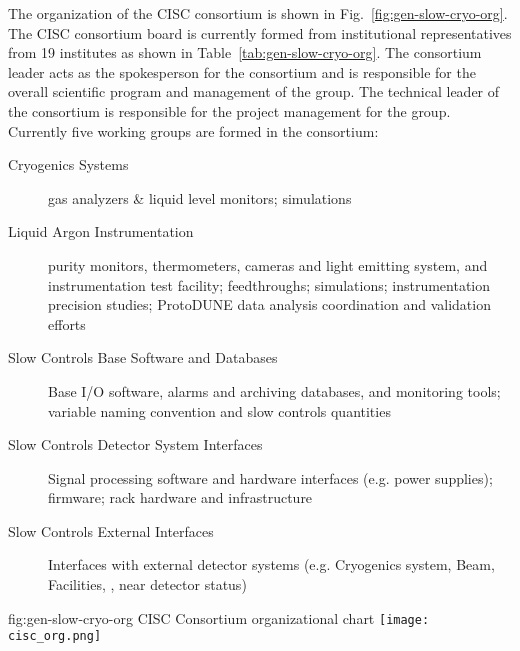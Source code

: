 The organization of the CISC consortium is shown in
Fig.~\ref{fig:gen-slow-cryo-org}. The CISC consortium board is currently formed from institutional representatives from 19 institutes as shown in Table~\ref{tab:gen-slow-cryo-org}. The consortium leader acts as the spokesperson for the consortium and is responsible for the overall scientific program and management of the group. The technical leader of the consortium is responsible for the project management for the group. Currently five working groups are formed in the
consortium:
\begin{description}
 \item[Cryogenics Systems] gas analyzers \& liquid level
  monitors;  simulations
 \item[Liquid Argon Instrumentation] purity monitors, thermometers, cameras and light emitting system, and instrumentation test facility; feedthroughs; \efield simulations; instrumentation precision studies; ProtoDUNE data analysis coordination and validation efforts
 \item [Slow Controls Base Software and Databases]  Base I/O software, alarms and archiving databases, and monitoring tools;
   variable naming convention and slow controls quantities
 \item [Slow Controls Detector System Interfaces] Signal processing software and hardware interfaces (e.g. power supplies); firmware; rack hardware and infrastructure   
 \item [Slow Controls External Interfaces] Interfaces with external detector systems (e.g. Cryogenics system, Beam, Facilities, , near detector status)
\end{description}

\begin{dunefigure}{fig:gen-slow-cryo-org}
{CISC Consortium organizational chart}
\texttt{[image: cisc\_org.png]}
\end{dunefigure}


